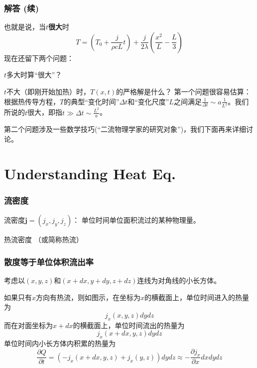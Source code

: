 \documentclass[CJK]{beamer}
\begin{document}
\begin{frame}
  \frametitle{ 解答 (续)}
  
  也就是说，当$t${\bf 很大}时
  $$ T = \left(T_0+\frac{j}{\rho cL} t\right) + \frac{j}{2\lambda} \left(\frac{x^2}{L} - \frac{L}{3}\right)  $$
  现在还留下两个问题：
  \bitem
\item{$t$多大时算“很大”？}
\item{$t$不大（即刚开始加热）时，$T(x,t)$的严格解是什么？}
  \eitem
 第一个问题很容易估算：根据热传导方程，$T$的典型“变化时间”$\Delta t$和“变化尺度”$L$之间满足$ \frac{1}{\Delta t} \sim a\frac{1}{L^2} $。我们所说的$t$很大，即指$t\gg \Delta t \sim \frac{L^2}{a}$。

  第二个问题涉及一些数学技巧(“二流物理学家的研究对象”\huaixiao)，我们下面再来详细讨论。
  
\end{frame}



\section{Understanding Heat Eq.}


\begin{frame}
  \frametitle{流密度}
  
  流密度$ \mathbf{j} = (j_x, j_y, j_z) $： 单位时间单位面积流过的某种物理量。
  
  \bex
  热流密度 （或简称热流）

  \eex  

  
\end{frame}


\begin{frame}
  \frametitle{散度等于单位体积流出率}
  {\small
  考虑以$(x, y, z)$和$(x+dx, y+dy, z+dz)$连线为对角线的小长方体。

  
  如果只有$x$方向有热流，则如图示，在坐标为$x$的横截面上，单位时间进入的热量为
  $$j_x(x, y, z) dy dz$$
  而在对面坐标为$x+dx$的横截面上，单位时间流出的热量为
  $$ j_x(x+dx,y,z)dydz$$
  单位时间内小长方体内积累的热量为
  $$ \frac{\partial Q}{\partial t} = (-j_x(x+dx, y, z) + j_x(y, z))dy dz \approx  - \frac{\partial j_x}{\partial x} dxdydz $$
  
  }
\end{frame}
\end{document}
